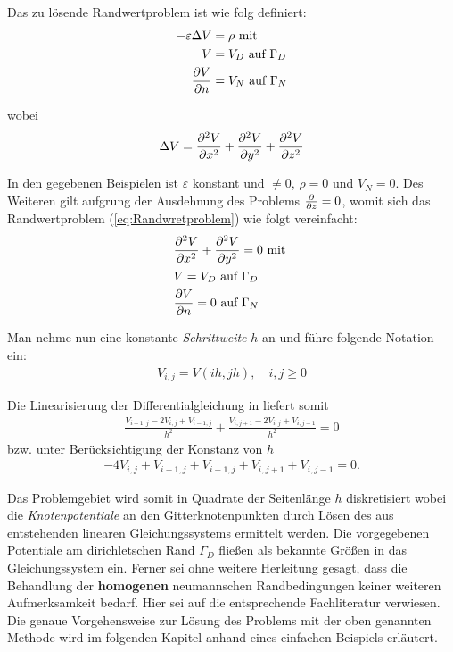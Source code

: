 
Das zu lösende Randwertproblem ist wie folg definiert:
\begin{align}
	\label{eq:Randwretproblem}
	-\varepsilon \Delta V &=  \rho  \text{ mit }\\
	V &= V_D \text{ auf } \Gamma_D \nonumber\\
	\frac{\partial V}{\partial n} &= V_N \text{ auf } \Gamma_N \nonumber
\end{align}

wobei \begin{align}
	\label{eq:LaplaceV}
	\Delta V = \frac{\partial^2 V}{\partial x^2} + \frac{\partial^2 V}{\partial y^2} + \frac{\partial^2 V}{\partial z^2}
\end{align}

In den gegebenen Beispielen ist $\varepsilon$ konstant und $\neq 0$, $\rho = 0$ und $V_N = 0$. Des Weiteren gilt aufgrung der Ausdehnung des Problems $\frac{\partial }{\partial z} = 0$, womit sich das Randwertproblem (\ref{eq:Randwretproblem}) wie folgt vereinfacht:
\begin{align}
	\label{eq:Randwertproblem_simple}
	&\frac{\partial^2 V}{\partial x^2} + \frac{\partial^2 V}{\partial y^2} = 0 \text{ mit }\\
	&V = V_D \text{ auf } \Gamma_D \nonumber\\
	&\frac{\partial V}{\partial n} = 0 \text{ auf } \Gamma_N \nonumber
\end{align}

Man nehme nun eine konstante \textit{Schrittweite} $h$ an und führe folgende Notation ein:
\begin{align*}
	V_{i,j} = V(ih,jh),\quad i,j\geq 0
\end{align*}

Die Linearisierung der Differentialgleichung in  liefert somit
\begin{align*}
	\frac{V_{i+1,j} - 2V_{i,j} + V_{i-1,j}}{h^2} + \frac{V_{i,j+1} - 2V_{i,j} + V_{i,j-1}}{h^2} = 0
\end{align*}
bzw. unter Berücksichtigung der Konstanz von $h$
\begin{align}
	\label{eq:lin_eq}
	-4V_{i,j} + V_{i+1,j} + V_{i-1,j} + V_{i,j+1} + V_{i,j-1} = 0.
\end{align}

Das Problemgebiet wird somit in Quadrate der Seitenlänge $h$ diskretisiert wobei die \textit{Knotenpotentiale} an den Gitterknotenpunkten durch Lösen des aus  entstehenden linearen Gleichungssystems ermittelt werden. Die vorgegebenen Potentiale am dirichletschen Rand $\Gamma_D$ fließen als bekannte Größen in das Gleichungssystem ein. \newline
Ferner sei ohne weitere Herleitung gesagt, dass die Behandlung der \textbf{homogenen} neumannschen Randbedingungen keiner weiteren Aufmerksamkeit bedarf. Hier sei auf die entsprechende Fachliteratur verwiesen. \newline
Die genaue Vorgehensweise zur Lösung des Problems mit der oben genannten Methode wird im folgenden Kapitel anhand eines einfachen Beispiels erläutert.

	
	

     


